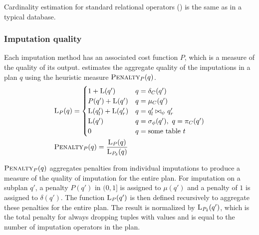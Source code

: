 {Cardinality estimation for standard relational operators () is the same as in a typical database.
\begin{algorithm}

\end{algorithm}

\subsubsection{Imputation quality} 
\label{sec:quality}
Each imputation method has an associated cost function $P$, which is a measure of the quality of its output.
\ProjectName{} estimates the aggregate quality of the imputations in a plan $q$ using the heuristic measure $\textsc{Penalty}_{P}(q)$. 
\begin{align*}
    &\textsc{L}_{P}(q) = \begin{cases}
     1 + \textsc{L}(q') & q = \delta_C(q') \\
     P(q') + \textsc{L}(q') & q = \mu_C(q') \\
     \textsc{L}(q_l') + \textsc{L}(q_r') & q = q_l' \bowtie_\psi q_r' \\
     \textsc{L}(q') & q = \sigma_\phi(q'),\ q = \pi_C(q') \\
     0 & q = \text{some table } t\\
  \end{cases}\\
    &\textsc{Penalty}_{P}(q) = \frac{\textsc{L}_{P}(q)}{\textsc{L}_{P_\delta}(q)}
\end{align*}

$\textsc{Penalty}_{P}(q)$ aggregates penalties from individual imputations to produce a measure of the quality of imputation for the entire plan.
For imputation on a subplan $q'$, a penalty $P(q')$ in $(0,1]$ is assigned to $\mu(q')$
and a penalty of $1$ is assigned to $\delta(q')$.
The function $\textsc{L}_{P}(q')$ is then defined recursively to aggregate these penalties for the entire plan. 
The result is normalized by $\textsc{L}_{P_\delta}(q')$, which is the total penalty for always dropping tuples with \nullv{} values and is equal to the number of imputation operators in the plan.

}
